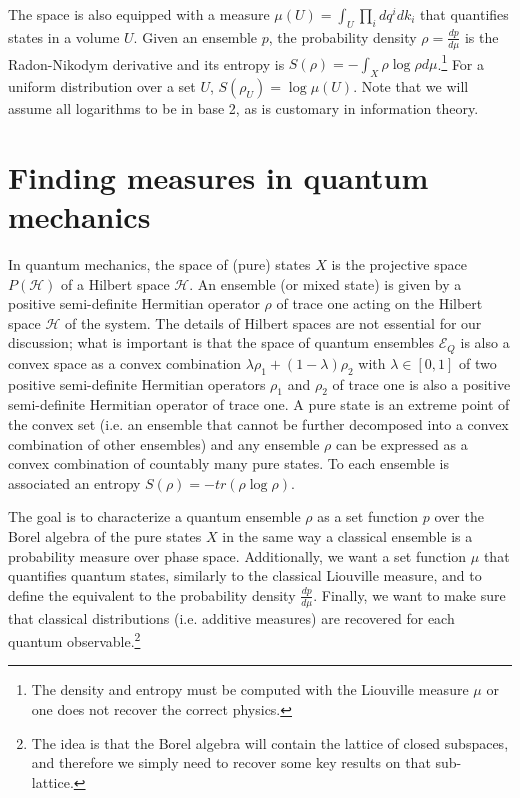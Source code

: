 \documentclass{styles/svproc}
\begin{document}
The space is also equipped with a measure $\mu(U) = \int_U \prod_i dq^i dk_i$ that quantifies states in a volume $U$. Given an ensemble $p$, the probability density $\rho = \frac{dp}{d\mu}$ is the Radon-Nikodym derivative and its entropy is $S(\rho) = - \int_X \rho \log \rho d\mu$.\footnote{The density and entropy must be computed with the Liouville measure $\mu$ or one does not recover the correct physics.} For a uniform distribution over a set $U$, $S(\rho_U) = \log \mu(U)$. Note that we will assume all logarithms to be in base 2, as is customary in information theory.

\section{Finding measures in quantum mechanics}

In quantum mechanics, the space of (pure) states $X$ is the projective space $P(\mathcal{H})$ of a Hilbert space $\mathcal{H}$. An ensemble (or mixed state) is given by a positive semi-definite Hermitian operator $\rho$ of trace one acting on the Hilbert space $\mathcal{H}$ of the system. The details of Hilbert spaces are not essential for our discussion; what is important is that the space of quantum ensembles $\mathcal{E}_Q$ is also a convex space as a convex combination $\lambda \rho_1 + (1 - \lambda) \rho_2$ with $\lambda \in [0,1]$ of two positive semi-definite Hermitian operators $\rho_1$ and $\rho_2$ of trace one is also a positive semi-definite Hermitian operator of trace one. A pure state is an extreme point of the convex set (i.e. an ensemble that cannot be further decomposed into a convex combination of other ensembles) and any ensemble $\rho$ can be expressed as a convex combination of countably many pure states. To each ensemble is associated an entropy $S(\rho) = - tr(\rho \log \rho)$. 

The goal is to characterize a quantum ensemble $\rho$ as a set function $p$ over the Borel algebra of the pure states $X$ in the same way a classical ensemble is a probability measure over phase space. Additionally, we want a set function $\mu$ that quantifies quantum states, similarly to the classical Liouville measure, and to define the equivalent to the probability density $\frac{dp}{d\mu}$. Finally, we want to make sure that classical distributions (i.e. additive measures) are recovered for each quantum observable.\footnote{The idea is that the Borel algebra will contain the lattice of closed subspaces, and therefore we simply need to recover some key results on that sub-lattice.}
\end{document}
